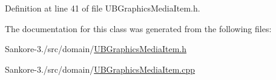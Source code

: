 Definition at line 41 of file U\-B\-Graphics\-Media\-Item.\-h.



The documentation for this class was generated from the following files\-:\begin{DoxyCompactItemize}
\item 
Sankore-\/3./src/domain/\hyperlink{_u_b_graphics_media_item_8h}{U\-B\-Graphics\-Media\-Item.\-h}\item 
Sankore-\/3./src/domain/\hyperlink{_u_b_graphics_media_item_8cpp}{U\-B\-Graphics\-Media\-Item.\-cpp}\end{DoxyCompactItemize}
